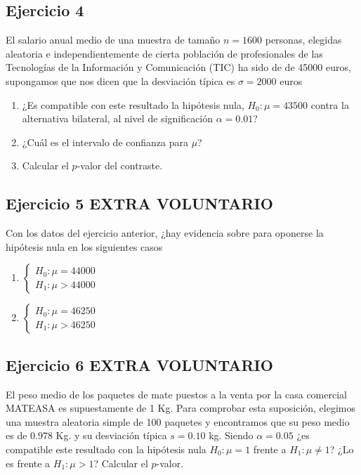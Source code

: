 \documentclass[
]{article}
\providecommand{\tightlist}{%
  \setlength{\itemsep}{0pt}\setlength{\parskip}{0pt}}
\begin{document}
\hypertarget{ejercicio-4}{%
\subsection{Ejercicio 4}\label{ejercicio-4}}

El salario anual medio de una muestra de tamaño \(n= 1600\) personas,
elegidas aleatoria e independientemente de cierta población de
profesionales de las Tecnologías de la Información y Comunicación (TIC)
ha sido de de 45000 euros, supongamos que nos dicen que la desviación
típica es \(\sigma=2000\) euros

\begin{enumerate}
\def\labelenumi{\arabic{enumi}.}
\tightlist
\item
  ¿Es compatible con este resultado la hipótesis nula,
  \(H_{0}:\mu=43500\) contra la alternativa bilateral, al nivel de
  significación \(\alpha=0.01\)?
\item
  ¿Cuál es el intervalo de confianza para \(\mu\)?
\item
  Calcular el \(p\)-valor del contraste.
\end{enumerate}

\hypertarget{ejercicio-5-extra-voluntario}{%
\subsection{Ejercicio 5 EXTRA
VOLUNTARIO}\label{ejercicio-5-extra-voluntario}}

Con los datos del ejercicio anterior, ¿hay evidencia sobre para oponerse
la hipótesis nula en los siguientes casos

\begin{enumerate}
\def\labelenumi{\arabic{enumi}.}
\tightlist
\item
  \(\left\{\begin{array}{ll} H_{0}:\mu=44000\\ H_{1}:\mu>44000\end{array}\right.\)
\item
  \(\left\{\begin{array}{ll} H_{0}:\mu=46250\\ H_{1}:\mu>46250\end{array}\right.\)
\end{enumerate}

\hypertarget{ejercicio-6-extra-voluntario}{%
\subsection{Ejercicio 6 EXTRA
VOLUNTARIO}\label{ejercicio-6-extra-voluntario}}

El peso medio de los paquetes de mate puestos a la venta por la casa
comercial MATEASA es supuestamente de 1 Kg. Para comprobar esta
suposición, elegimos una muestra aleatoria simple de 100 paquetes y
encontramos que su peso medio es de 0.978 Kg. y su desviación típica
\(s=0.10\) kg. Siendo \(\alpha=0.05\) ¿es compatible este resultado con
la hipótesis nula \(H_{0}:\mu=1\) frente a \(H_{1}:\mu\not=1\)? ¿Lo es
frente a \(H_{1}:\mu>1\)? Calcular el \(p\)-valor.
\end{document}
